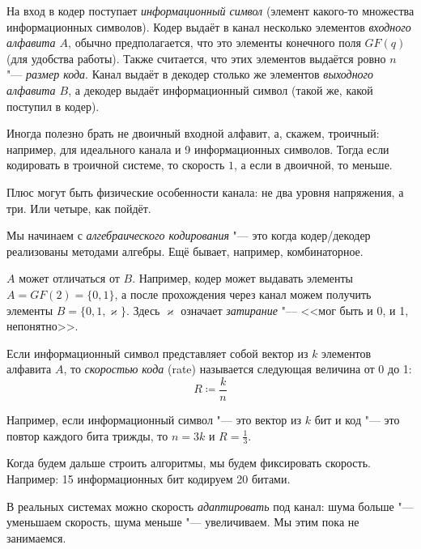 \begin{Def}
	На вход в кодер поступает \textit{информационный символ} (элемент какого-то множества информационных символов).
	Кодер выдаёт в канал несколько элементов \textit{входного алфавита $A$}, обычно предполагается,
	что это элементы конечного поля $GF(q)$ (для удобства работы).
	Также считается, что этих элементов выдаётся ровно $n$ "--- \textit{размер кода}.
	Канал выдаёт в декодер столько же элементов \textit{выходного алфавита $B$}, а декодер выдаёт информационный символ
	(такой же, какой поступил в кодер).
\end{Def}
\begin{Rem}
	Иногда полезно брать не двоичный входной алфавит, а, скажем, троичный:
	например, для идеального канала и 9 информационных символов.
	Тогда если кодировать в троичной системе, то скорость $1$, а если в двоичной, то меньше.
\end{Rem}
\begin{Rem}
	Плюс могут быть физические особенности канала: не два уровня напряжения, а три.
	Или четыре, как пойдёт.
\end{Rem}
\begin{Rem}
	Мы начинаем с \textit{алгебраического кодирования} "--- это когда кодер/декодер реализованы
	методами алгебры.
	Ещё бывает, например, комбинаторное.
\end{Rem}

\begin{exmp}
	$A$ может отличаться от $B$.
	Например, кодер может выдавать элементы $A=GF(2)=\{0, 1\}$,
	а после прохождения через канал можем получить элементы $B=\{0, 1, \varkappa\}$.
	Здесь $\varkappa$ означает \textit{затирание} "--- <<мог быть и 0, и 1, непонятно>>.
\end{exmp}

\begin{Def}
	Если информационный символ представляет собой вектор из $k$ элементов алфавита $A$,
	то \textit{скоростью кода} (rate) называется следующая величина от 0 до 1:
	\[
		R \coloneqq \frac{k}{n}
	\]
\end{Def}
\begin{exmp}
	Например, если информационный символ "--- это вектор из $k$ бит
	и код "--- это повтор каждого бита трижды, то $n=3k$ и $R=\frac13$.
\end{exmp}
\begin{Rem}
	Когда будем дальше строить алгоритмы, мы будем фиксировать скорость.
	Например: 15 информационных бит кодируем 20 битами.
\end{Rem}
\begin{Rem}
	В реальных системах можно скорость \textit{адаптировать} под канал:
	шума больше "--- уменьшаем скорость, шума меньше "--- увеличиваем.
	Мы этим пока не занимаемся.
\end{Rem}

